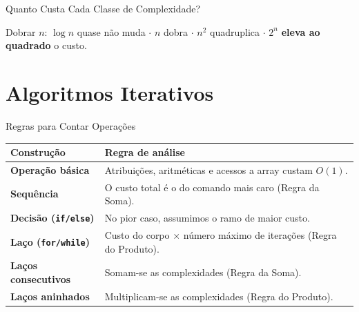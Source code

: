 \documentclass[aspectratio=169]{beamer}
\begin{document}
\begin{frame}[shrink]{Quanto Custa Cada Classe de Complexidade?}
  \begin{center}
  \end{center}

  \begin{center}
  \small Dobrar $n$: $\log n$ quase não muda $\cdot$ $n$ dobra $\cdot$
  $n^2$ quadruplica $\cdot$ $2^n$ \textbf{eleva ao quadrado} o custo.
  \end{center}
\end{frame}

\section{Algoritmos Iterativos}

\begin{frame}[shrink]{Regras para Contar Operações}
  \begin{center}
  \renewcommand{\arraystretch}{1.4}
  \begin{tabular}{>{\bfseries}l p{8.5cm}}
    \toprule
    Construção & Regra de análise \\
    \midrule
    Operação básica & Atribuições, aritméticas e acessos a array custam $O(1)$. \\
    Sequência & O custo total é o do comando mais caro (Regra da Soma). \\
    Decisão (\texttt{if/else}) & No pior caso, assumimos o ramo de maior custo. \\
    Laço (\texttt{for/while}) & Custo do corpo $\times$ número máximo de iterações (Regra do Produto). \\
    Laços consecutivos & Somam-se as complexidades (Regra da Soma). \\
    Laços aninhados & Multiplicam-se as complexidades (Regra do Produto). \\
    \bottomrule
  \end{tabular}
  \end{center}
\end{frame}
\end{document}
